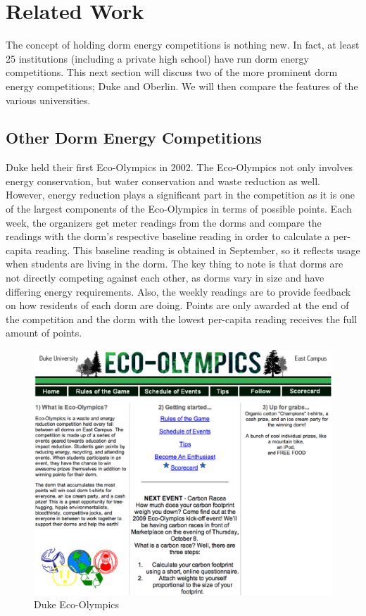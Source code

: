 \chapter{Related Work}
\label{relatedwork}

The concept of holding dorm energy competitions is nothing new.  In fact, at least 25 institutions (including a private high school) have run dorm energy competitions.  This next section will discuss two of the more prominent dorm energy competitions; Duke and Oberlin.  We will then compare the features of the various universities.

\section{Other Dorm Energy Competitions}
\label{othercomps}

Duke held their first Eco-Olympics\cite{duke-eco-lympics} in 2002.  The Eco-Olympics not only involves energy conservation, but water conservation and waste reduction as well.  However, energy reduction plays a significant part in the competition as it is one of the largest components of the Eco-Olympics in terms of possible points.  Each week, the organizers get meter readings from the dorms and compare the readings with the dorm's respective baseline reading in order to calculate a per-capita reading.  This baseline reading is obtained in September, so it reflects usage when students are living in the dorm.   The key thing to note is that dorms are not directly competing against each other, as dorms vary in size and have differing energy requirements.  Also, the weekly readings are to provide feedback on how residents of each dorm are doing.  Points are only awarded at the end of the competition and the dorm with the lowest per-capita reading receives the full amount of points.

\begin{figure}[h]
	\includegraphics[scale=0.25]{images/duke-ecolympics.eps}
	\caption{Duke Eco-Olympics}
\end{figure}

